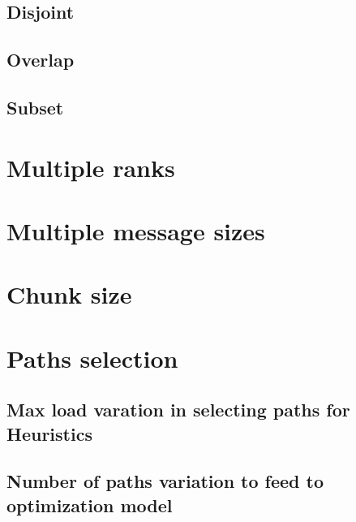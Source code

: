 \documentclass[letter]{article}
\begin{document}
\clearpage
\newpage

\subsection{Disjoint}



\subsection{Overlap}



\subsection{Subset}



\clearpage
\newpage

\section{Multiple ranks}

\section{Multiple message sizes}

\section{Chunk size}

\section{Paths selection}

\subsection{Max load varation in selecting paths for Heuristics}

\subsection{Number of paths variation to feed to optimization model}
\end{document}

